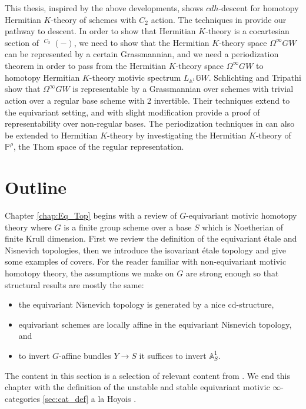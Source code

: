 \documentclass[edeposit,fullpage]{uiucthesis2009}
\newcommand{\mbb}{\mathbb}
\DeclareMathOperator{\SH}{\underline{SH}}
\theoremstyle{plain}
\numberwithin{lemma}{section}
\theoremstyle{definition}
\begin{document}
This thesis, inspired by the above developments, shows $cdh$-descent
for homotopy Hermitian $K$-theory of schemes with $C_2$ action. The
techniques in \cite{cdhdesc} provide our pathway to descent. In order
to show that Hermitian $K$-theory is a cocartesian section of
$\SH^{C_2}(-)$, we need to show that the Hermitian $K$-theory space
$\Omega^\infty GW$ can be represented by a certain Grassmannian, and
we need a periodization theorem in order to pass from the Hermitian
$K$-theory space $\Omega^\infty
GW$ to homotopy Hermitian $K$-theory motivic spectrum $L_{\mbb
  A^1}\mbb GW$. Schlichting and Tripathi \cite{SchTri} show that
$\Omega^\infty GW$ is representable by a Grassmannian over schemes
with trivial action over a regular base scheme with 2 invertible. Their techniques extend to the equivariant
setting, and with slight modification provide a proof of
representability over non-regular bases. The periodization techniques
in \cite{cdhdesc} can also be extended to Hermitian $K$-theory by
investigating the Hermitian $K$-theory of $\mbb P^\rho$, the Thom
space of the regular representation.

\section{Outline}

Chapter \ref{chap:Eq_Top} begins with a review of $G$-equivariant motivic
homotopy theory where $G$ is a finite group scheme over a base $S$
which is Noetherian of finite Krull dimension. First we review the definition of the equivariant
\'etale and Nisnevich topologies, then we introduce the isovariant
\'etale topology and give some examples of covers. For the reader
familiar with non-equivariant motivic homotopy theory, the assumptions
we make on $G$ are strong enough so that structural results are mostly
the same:
\begin{itemize}
\item the equivariant Nisnevich topology is generated by a nice cd-structure,
\item equivariant schemes are locally affine in the equivariant
  Nisnevich topology, and
\item to invert $G$-affine bundles $Y \rightarrow S$ it suffices to
  invert $\mbb A_S^1$.
\end{itemize}

The content in this section is a selection of relevant content from
\cite{GrpSchHell}. We end this chapter with the definition of the unstable and stable
equivariant motivic $\infty$-categories \ref{sec:cat_def} a la Hoyois
\cite{HoyoisSixOp}.
\end{document}
